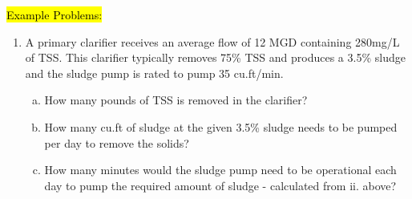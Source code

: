 				\hl{Example Problems:}\\
					\begin{enumerate}
						\item A primary clarifier receives an average flow of 12 MGD containing 280mg/L of TSS.  This clarifier typically removes 75\% TSS  and produces a 3.5\% sludge and the sludge pump is rated to pump 35 cu.ft/min.
							\begin{enumerate}[a.]
								\item How many pounds of TSS is removed in the clarifier?

								\item How many cu.ft of sludge at the given 3.5\% sludge needs to be pumped per day to remove the solids?

								\item How many minutes would the sludge pump need to be operational each day to pump the required amount of sludge - calculated from ii.  above?


\end{enumerate}
\end{enumerate}
